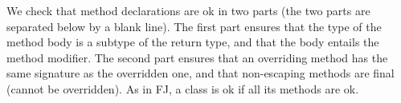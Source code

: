 We check that method declarations are ok in two parts (the two parts are separated below by a blank line).
The first part ensures that the type of the method body is a subtype
    of the return type, and that the body entails the method modifier.
The second part ensures that an overriding method
    has the same signature as the overridden one,
    and that non-escaping methods are final (cannot be overridden). %
As in FJ, a class is ok if all its methods are ok.

\beqst %
\eeq




